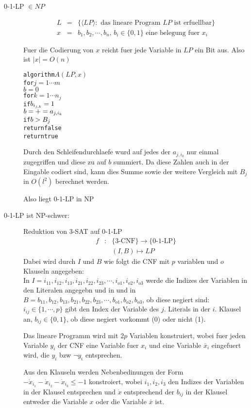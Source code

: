 \begin{description}
\item[0-1-LP $\in NP$]

\begin{eqnarray}
L &=& \{ \langle LP \rangle: \text{ das lineare Program $LP$ ist erfuellbar} \}  \\
x &=& b_1, b_2, \cdots, b_n \text{, $b_i \in \{0,1\}$ eine belegung fuer $x_i$}
\end{eqnarray}

Fuer die Codierung von $x$ reicht fuer jede Variable in $LP$ ein Bit aus. Also 
ist $|x| = O(n)$

\begin{alltt}
algorithm \(A(LP,x)\)
    for \(j = 1 \cdots m\)
       \(b=0 \)
       for \(k = 1 \cdots n_j\)
          if \(b\sb{i\sb{j,k}} = 1\)
             \(b = += a\sb{j,i\sb{k}}\)
       if \(b > B\sb{j}\)
          return false
    return true
\end{alltt}

Durch den Schleifendurchlaefe wurd auf jedes der $a_{j,i_{k}}$ nur einmal zugegriffen
und diese zu auf $b$ summiert. Da diese Zahlen auch in der Eingable codiert sind,
kann dies Summe sowie der weitere Vergleich mit $B_j$ in $O(l^2)$ berechnet werden.

Also liegt 0-1-LP in NP


\item[0-1-LP ist NP-schwer:] Reduktion von 3-SAT auf 0-1-LP
\begin{eqnarray}
f &:& \{\text{3-CNF}\} \to \{\text{0-1-LP}\} \\
  && (I,B) \mapsto LP
\end{eqnarray}
Dabei wird durch $I$ und $B$ wie folgt die CNF mit $p$ variablen und $o$ Klauseln angegeben:\\
In $I = i_{11},i_{12},i_{13}, i_{21}, i_{22}, i_{23}, \cdots, i_{o1}, i_{o2}, i_{o3}$
werde die Indizes der Variablen in den Literalen angegebn und in
und in $B = b_{11},b_{12},b_{13}, b_{21}, b_{22}, b_{23}, \cdots, b_{o1}, b_{o2}, b_{o3}$,
ob diese negiert sind:
$i_{ij} \in \{1,\cdots,p\}$ gibt den Index der Variable des $j$. Literals in der $i$. Klausel an,
$b_{ij} \in \{0,1\}$, ob diese negiert vorkommt (0) oder nicht (1).

Das lineare Programm wird mit $2p$ Variablen konstruiert,
wobei fuer jeden Variable $y_i$ der CNF eine Variable fuer $x_i$ und eine Variable $\bar{x}_i$
eingefuert wird, die $y_i$ bzw $\lnot y_i$ entsprechen.

Aus den Klauseln werden Nebenbedinungen der Form $-\dot x_{i_1} - \dot x_{i_2} - \dot x_{i_3}\leq -1$ konstroiert,
wobei $i_1, i_2, i_3$ den Indizes der Variablen in der Klausel entsprechen und
$\dot x$ entsprechend der $b_{ij}$ in der Klausel entweder die Variable $x$ oder die Variable $\bar x$ ist.


\end{description}
